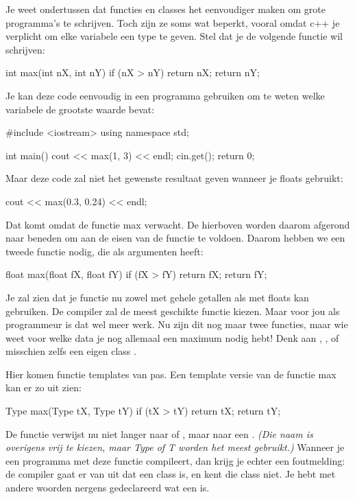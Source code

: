 \documentclass[11pt, oldfontcommands, oneside, a4paper]{memoir}
\begin{document}
Je weet ondertussen dat functies en classes het eenvoudiger maken om grote programma's te schrijven. Toch zijn ze soms wat beperkt, vooral omdat c++ je verplicht om elke variabele een type te geven. Stel dat je de volgende functie wil schrijven:

\begin{code}
int max(int nX, int nY) {
	if (nX > nY) return nX;
	return nY;
}
\end{code}

Je kan deze code eenvoudig in een programma gebruiken om te weten welke variabele de grootste waarde bevat:

\begin{code}
#include <iostream>
using namespace std;

int main() {
	cout << max(1, 3) << endl;
	cin.get();	
	return 0;
}
\end{code}

Maar deze code zal niet het gewenste resultaat geven wanneer je floats gebruikt:

\begin{code}
cout << max(0.3, 0.24) << endl;
\end{code}

Dat komt omdat de functie max  verwacht. De  hierboven worden daarom afgerond naar beneden om aan de eisen van de functie  te voldoen. Daarom hebben we een tweede functie  nodig, die  als argumenten heeft:

\begin{code}
float max(float fX, float fY) {
	if (fX > fY) return fX;
	return fY;
}
\end{code}

Je zal zien dat je functie  nu zowel met gehele getallen als met floats kan gebruiken. De compiler zal de meest geschikte functie kiezen. Maar voor jou als programmeur is dat wel meer werk. Nu zijn dit nog maar twee functies, maar wie weet voor welke data je nog allemaal een maximum nodig hebt! Denk aan , , of misschien zelfs een eigen class .

Hier komen functie templates van pas. Een template versie van de functie max kan er zo uit zien:

\begin{code}
Type max(Type tX, Type tY) {
  if (tX > tY) return tX;
  return tY;
}
\end{code}

De functie verwijst nu niet langer naar  of , maar naar een . \textsl{(Die naam is overigens vrij te kiezen, maar Type of T worden het meest gebruikt.)} Wanneer je een programma met deze functie compileert, dan krijg je echter een foutmelding: de compiler gaat er van uit dat  een class is, en kent die class niet. Je hebt met andere woorden nergens gedeclareerd wat een  is.
\end{document}
